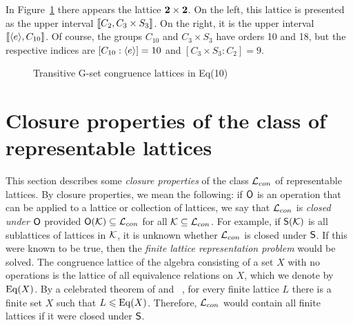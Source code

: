 In Figure~\ref{fig:10} there appears the lattice $\mathbf{2}\times \mathbf{2}$.
On the left, this lattice is presented as the upper interval
$\llbracket C_2, C_3 \times S_3\rrbracket$. On the right, it is the upper interval 
$\llbracket \langle e\rangle, C_{10}\rrbracket$. Of course, the groups $C_{10}$ and
$C_3 \times S_3$ have orders 10 and 18, but the respective indices are
$[C_{10}:\langle e\rangle] = 10$ and $[C_3 \times S_3:C_2]=9$. 
\begin{figure}
\caption{Transitive G-set congruence lattices in Eq(10)}
\label{fig:10}
\begin{center}
\end{center}
\end{figure}


\section{Closure properties of the class of representable lattices}
\label{sec:clos-prop-class}
This section describes some
\emph{closure properties}
of the class $\mathcal{L}_{con}$ of representable lattices. 
By closure properties, we mean the following: if $\mathsf{O}$ is an operation that can
be applied to a lattice or collection of lattices, we say that $\mathcal{L}_{con}$ is
\emph{closed under $\mathsf{O}$} provided $\mathsf{O}(\mathcal{K}) \subseteq \mathcal{L}_{con}$ for all 
$\mathcal{K}\subseteq \mathcal{L}_{con}$. For example, if 
$\mathsf{S}(\mathcal{K})$ is all sublattices of lattices in $\mathcal{K}$, 
it is unknown whether $\mathcal{L}_{con}$ is closed under $\mathsf{S}$.  
If this were known to be true, then the 
\emph{finite lattice representation problem} would be solved.
The congruence lattice of the algebra consisting of a
set $X$ with no operations is the lattice of all equivalence relations on $X$,
which we denote by $\operatorname{Eq}(X)$.
By a celebrated theorem of \Pudlak and \Tuma~\cite{Pudlak:1980}, for every finite
lattice $L$ there is a finite set $X$ such that $L\leqslant \operatorname{Eq}(X)$.  Therefore, $\mathcal{L}_{con}$
would contain all finite lattices if it were closed under $\mathsf{S}$.

